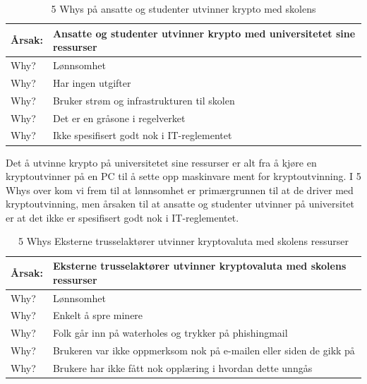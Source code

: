 \begin{table} [H]
    \centering
    \begin{tabular}{ | m{5em} | m{30em} | }
        \hline
            \cellcolor{yellow} Årsak: & \cellcolor{yellow} Ansatte og studenter utvinner krypto med universitetet sine ressurser                \\
        \hline
            Why? & Lønnsomhet                                    \\
        \hline
            Why? & Har ingen utgifter                                            \\
        \hline
            Why? & Bruker strøm og infrastrukturen til skolen                \\
        \hline
            Why? & Det er en gråsone i regelverket           \\
        \hline
            Why? & Ikke spesifisert godt nok i IT-reglementet   \\
        \hline
    \end{tabular}
    \caption[5 Whys: Ansatte og studenter utvinner krypto med skolens]{5 Whys på ansatte og studenter utvinner krypto med skolens}
    \label{5Whys-interne}
\end{table}
Det å utvinne krypto på universitetet sine ressurser er alt fra å kjøre en kryptoutvinner på en PC til å sette opp maskinvare ment for kryptoutvinning. I 5 Whys over kom vi frem til at lønnsomhet er primærgrunnen til at de driver med kryptoutvinning, men årsaken til at ansatte og studenter utvinner på universitet er at det ikke er spesifisert godt nok i IT-reglementet.   


\begin{table} [H]
    \centering
    \begin{tabular}{ | m{5em} | m{30em} | }
        \hline
            \cellcolor{yellow} Årsak: & \cellcolor{yellow} Eksterne trusselaktører utvinner kryptovaluta med skolens ressurser              \\
        \hline
            Why? & Lønnsomhet                                   \\
        \hline
            Why? & Enkelt å spre minere                                           \\
        \hline
            Why? & Folk går inn på waterholes og trykker på phishingmail               \\
        \hline
            Why? & Brukeren var ikke oppmerksom nok på e-mailen eller siden de gikk på           \\
        \hline
            Why? & Brukere har ikke fått nok opplæring i hvordan dette unngås    \\
        \hline
    \end{tabular}
    \caption[5 Whys: Eksterne trusselaktører utvinner kryptovaluta med skolens ressurser]{5 Whys Eksterne trusselaktører utvinner kryptovaluta med skolens ressurser}
    \label{5Whys-eksterne}
\end{table}

